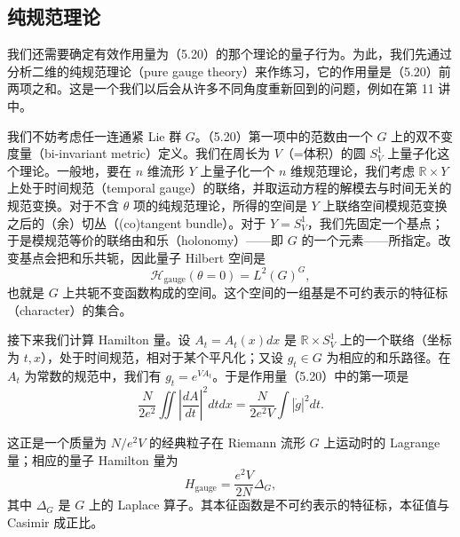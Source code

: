 
\subsection{纯规范理论}

我们还需要确定有效作用量为（5.20）的那个理论的量子行为。为此，我们先通过分析二维的纯规范理论（pure gauge theory）来作练习，它的作用量是（5.20）前两项之和。这是一个我们以后会从许多不同角度重新回到的问题，例如在第 11 讲中。

我们不妨考虑任一连通紧 Lie 群 $G$。（5.20）第一项中的范数由一个 $G$ 上的双不变度量（bi-invariant metric）定义。我们在周长为 $V$（=体积）的圆 $S^1_V$ 上量子化这个理论。一般地，要在 $n$ 维流形 $Y$ 上量子化一个 $n$ 维规范理论，我们考虑 $\mathbb{R}\times Y$ 上处于时间规范（temporal gauge）的联络，并取运动方程的解模去与时间无关的规范变换。对于不含 $\theta$ 项的纯规范理论，所得的空间是 $Y$ 上联络空间模规范变换之后的（余）切丛（(co)tangent bundle）。对于 $Y=S^1_V$，我们先固定一个基点；于是模规范等价的联络由和乐（holonomy）——即 $G$ 的一个元素——所指定。改变基点会把和乐共轭，因此量子 Hilbert 空间是
\[
  \mathcal{H}_{\mathrm{gauge}}(\theta=0)=L^2(G)^G,
\]
也就是 $G$ 上共轭不变函数构成的空间。这个空间的一组基是不可约表示的特征标（character）的集合。

接下来我们计算 Hamilton 量。设 $A_t=A_t(x)dx$ 是 $\mathbb{R}\times S^1_V$ 上的一个联络（坐标为 $t,x$），处于时间规范，相对于某个平凡化；又设 $g_t\in G$ 为相应的和乐路径。在 $A_t$ 为常数的规范中，我们有 $g_t=e^{VA_t}$。于是作用量（5.20）中的第一项是
\begin{equation}
  \tag{5.23}
  \label{eq:5-23}
  \frac{N}{2e^2}\iint\left|\frac{dA}{dt}\right|^2 dtdx=\frac{N}{2e^2V}\int|\dot g|^2dt.
\end{equation}


这正是一个质量为 $N/e^2V$ 的经典粒子在 Riemann 流形 $G$ 上运动时的 Lagrange 量；相应的量子 Hamilton 量为
\begin{equation}
  \tag{5.24}
  \label{eq:5-24}
  H_{\mathrm{gauge}}=\frac{e^2V}{2N}\Delta_G,
\end{equation}
其中 $\Delta_G$ 是 $G$ 上的 Laplace 算子。其本征函数是不可约表示的特征标，本征值与 Casimir 成正比。

